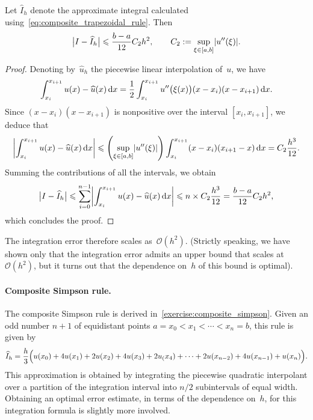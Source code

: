 \begin{theorem}
    Let $\widehat I_h$ denote the approximate integral calculated using~\eqref{eq:composite_trapezoidal_rule}.
    Then
    \begin{equation}
        \label{eq:error_bound_trapezoidal}
        \bigl\lvert I - \widehat I_h \bigr\rvert
        \leq \frac{b-a}{12} C_2 h^2,
        \qquad
        C_2 := \sup_{\xi \in [a, b]} \abs*{u''(\xi)}.
    \end{equation}
\end{theorem}

\begin{proof}
Denoting by~$\widehat u_h$ the piecewise linear interpolation of~$u$,
we have
\[
    \int_{x_{i}}^{x_{i+1}} u(x) - \widehat u(x) \, \mathrm d x
    = \frac{1}{2} \int_{x_{i}}^{x_{i+1}} u''\bigl(\xi(x)\bigr) (x - x_{i}) (x - x_{i+1}) \, \mathrm d x.
\]
Since $(x - x_i) (x - x_{i+1})$ is nonpositive over the interval $[x_i, x_{i+1}]$,
we deduce that
\[
    \abs*{\int_{x_{i}}^{x_{i+1}} u(x) - \widehat u(x) \, \d x}
    \leq \left( \sup_{\xi \in [a, b]} \abs*{u''(\xi)} \right) \int_{x_{i}}^{x_{i+1}} (x - x_{i}) (x_{i+1} - x) \, \d x
    = C_2 \frac{h^3}{12}.
\]
Summing the contributions of all the intervals,
we obtain
\[
    \bigl\lvert I - \widehat I_h \bigr\rvert
    \leq \sum_{i=0}^{n-1} \abs*{\int_{x_i}^{x_{i+1}} u(x) - \widehat u(x) \, \d x }
    \leq n \times C_2 \frac{h^3}{12} = \frac{b-a}{12} C_2 h^2,
\]
which concludes the proof.
\end{proof}

The integration error therefore scales as~$\mathcal O(h^2)$.
(Strictly speaking, we have shown only that the integration error admits an upper bound that scales at $\mathcal O(h^2)$,
but it turns out that the dependence on~$h$ of this bound is optimal).

\paragraph{Composite Simpson rule.}
The composite Simpson rule is derived in~\cref{exercise:composite_simpson}.
Given an odd number $n+1$ of equidistant points $a = x_0 < x_1 < \dotsb < x_n = b$,
this rule is given by
\begin{equation}
    \label{eq:composite_simpson}
    \widehat I_h = \frac{h}{3} \Bigl( u(x_0) + 4 u(x_1) + 2 u(x_2) + 4 u(x_3) + 2 u_(x_4) + \dotsb + 2 u(x_{n-2}) + 4 u(x_{n-1}) + u(x_n)\Bigr).
\end{equation}
This approximation is obtained by integrating the piecewise quadratic interpolant
over a partition of the integration interval into $n/2$ subintervals of equal width.
Obtaining an optimal error estimate,
in terms of the dependence on~$h$,
for this integration formula is slightly more involved.

